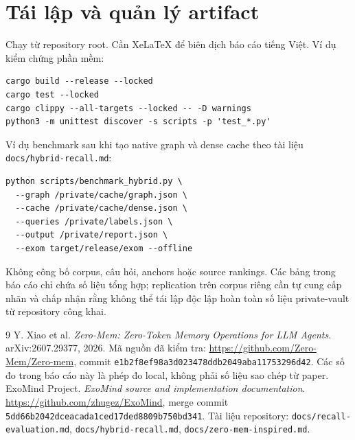 \documentclass[11pt,a4paper]{article}
\begin{document}
\appendix
\section{Tái lập và quản lý artifact}
Chạy từ repository root. Cần XeLaTeX để biên dịch báo cáo tiếng Việt. Ví dụ kiểm chứng phần mềm:
\begin{lstlisting}
cargo build --release --locked
cargo test --locked
cargo clippy --all-targets --locked -- -D warnings
python3 -m unittest discover -s scripts -p 'test_*.py'
\end{lstlisting}
Ví dụ benchmark sau khi tạo native graph và dense cache theo tài liệu \texttt{docs/hybrid-recall.md}:
\begin{lstlisting}
python scripts/benchmark_hybrid.py \
  --graph /private/cache/graph.json \
  --cache /private/cache/dense.json \
  --queries /private/labels.json \
  --output /private/report.json \
  --exom target/release/exom --offline
\end{lstlisting}
Không công bố corpus, câu hỏi, anchors hoặc source rankings. Các bảng trong báo cáo chỉ chứa số liệu tổng hợp; replication trên corpus riêng cần tự cung cấp nhãn và chấp nhận rằng không thể tái lập độc lập hoàn toàn số liệu private-vault từ repository công khai.

\begin{thebibliography}{9}
\bibitem{zeromem}
Y. Xiao et al. \emph{Zero-Mem: Zero-Token Memory Operations for LLM Agents}. arXiv:2607.29377, 2026. Mã nguồn đã kiểm tra: \url{https://github.com/Zero-Mem/Zero-mem}, commit \texttt{e1b2f8ef98a3d023478ddb2049aba11753296d42}. Các số đo trong báo cáo này là phép đo local, không phải số liệu sao chép từ paper.
\bibitem{exomind}
ExoMind Project. \emph{ExoMind source and implementation documentation}. \url{https://github.com/zhugez/ExoMind}, merge commit \texttt{5dd66b2042dceacada1ced17ded8809b750bd341}. Tài liệu repository: \texttt{docs/recall-evaluation.md}, \texttt{docs/hybrid-recall.md}, \texttt{docs/zero-mem-inspired.md}.
\end{thebibliography}
\end{document}
